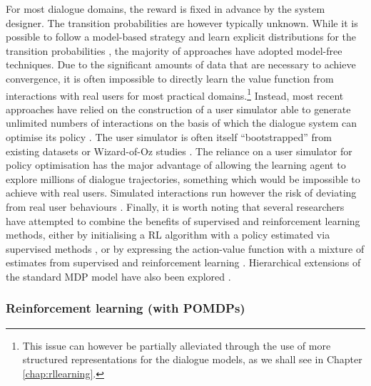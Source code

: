 For most dialogue domains, the reward is fixed in advance by the system designer.  The transition probabilities are however typically unknown.  While it is possible to follow a model-based strategy and learn explicit distributions for the transition probabilities \citep{Walker:2000,SinghLKW02}, the majority of approaches have adopted model-free techniques. Due to the significant amounts of data that are necessary to achieve convergence, it is often impossible to directly learn the value function from interactions with real users for most practical domains.\footnote{This issue can however be partially alleviated through the use of more structured representations for the dialogue models, as we shall see in Chapter \ref{chap:rllearning}.} Instead, most recent approaches have relied on the construction of a user simulator able to generate unlimited numbers of interactions on the basis of which the dialogue system can optimise its policy \citep{817450,InTech_RL_2008_OP,FramptonL09}.  The user simulator is often itself ``bootstrapped'' from existing datasets or Wizard-of-Oz studies \citep{GeorgilaHL06,Rieser:2010:LHM:1735495.1735497}. The reliance on a user simulator for policy optimisation has the major advantage of allowing the learning agent to explore millions of dialogue trajectories, something which would be impossible to achieve with real users.  Simulated interactions run however the risk of deviating from real user behaviours \citep{paek2006}.  Finally, it is worth noting that several researchers have attempted to combine the benefits of supervised and reinforcement learning methods, either by initialising a RL algorithm with  
a policy estimated via supervised methods \citep{williams2003, rieser2006}, or by expressing the action-value function with a mixture of estimates from supervised and reinforcement learning \citep{Henderson:2008}.  Hierarchical extensions of the standard MDP model have also been explored \citep{Cuayahuitl:2010}. 

\subsubsection*{Reinforcement learning (with POMDPs)}

